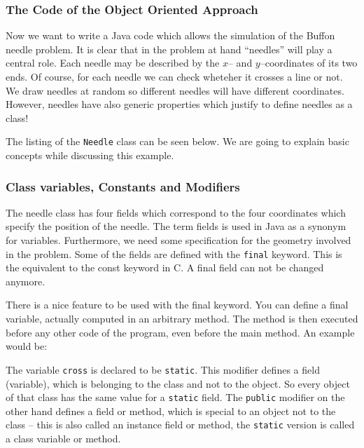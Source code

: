 \subsubsection{The Code of the Object Oriented Approach}
Now we want to
write a Java code which allows the simulation of the Buffon needle
problem. It is clear that in the problem at hand ``needles'' will play
a central role. Each needle may be described by the $x$-- and
$y$--coordinates of  its two ends. Of course, for each needle we can
check wheteher it crosses a line or not. We draw needles at random so
different needles will have different coordinates. However, needles
have also generic properties which justify to define needles as a class!

The listing of the \verb|Needle| class can be seen below. We are going
to explain basic concepts while discussing this example.


\subsubsection{Class variables, Constants and Modifiers}
The needle class has four fields which correspond to the four
coordinates which specify the position of the needle. 
The term fields is used in Java as a synonym for variables.
Furthermore, we
need some specification for the geometry involved in the problem.
Some of the fields  are
defined with the \verb|final| keyword. This is the equivalent to the
const keyword in C. A final field can not be changed anymore.

There is a nice feature to be used with the final keyword. You can
define a final variable, actually computed in an arbitrary method. 
The method is then executed before any other code of the program,
even before the main method. An example would be:

 
The variable \verb|cross| is declared to be \verb|static|.  This
modifier 
defines a field (variable), which is belonging
to the class and not to the object. So every object of that class 
has the same value for a \verb|static| field. The \verb|public| modifier
on the other hand defines a field or method, which is special to 
an object not to the class -- this is also called an instance field or
method, the \verb|static| version is called a class variable or
method.


